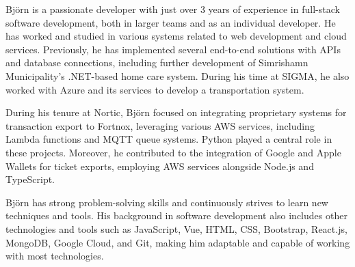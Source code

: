 Björn is a passionate developer with just over 3 years of experience in full-stack software development, both in larger teams and as an individual developer. He has worked and studied in various systems related to web development and cloud services. Previously, he has implemented several end-to-end solutions with APIs and database connections, including further development of Simrishamn Municipality's .NET-based home care system. During his time at SIGMA, he also worked with Azure and its services to develop a transportation system.

\vspace{6pt}
During his tenure at Nortic, Björn focused on integrating proprietary systems for transaction export to Fortnox, leveraging various AWS services, including Lambda functions and MQTT queue systems. Python played a central role in these projects.
Moreover, he contributed to the integration of Google and Apple Wallets for ticket exports, employing AWS services alongside Node.js and TypeScript.

\vspace{6pt}
Björn has strong problem-solving skills and continuously strives to learn new techniques and tools. His background in software development also includes other technologies and tools such as JavaScript, Vue, HTML, CSS, Bootstrap, React.js, MongoDB, Google Cloud, and Git, making him adaptable and capable of working with most technologies.